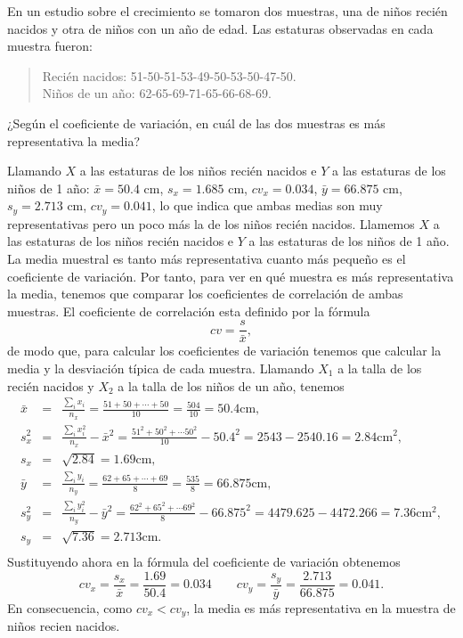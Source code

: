 {En un estudio sobre el crecimiento se tomaron dos muestras, una de niños recién nacidos y otra de niños con un año de edad. Las estaturas observadas en cada muestra fueron:
\begin{quote}
Recién nacidos: 51-50-51-53-49-50-53-50-47-50.\\
Niños de un año: 62-65-69-71-65-66-68-69.
\end{quote}

¿Según el coeficiente de variación, en cuál de las dos muestras es más representativa la media?
}
{Llamando $X$ a las estaturas de los niños recién nacidos e $Y$ a las estaturas de los niños de 1 año: 
$\bar x = 50.4$ cm, $s_x = 1.685$ cm, $cv_x=0.034$, $\bar y=66.875$ cm, $s_y=2.713$ cm, $cv_y=0.041$, lo que indica que ambas medias son muy representativas pero un poco más la de los niños recién nacidos.  
}
{Llamemos $X$ a las estaturas de los niños recién nacidos e $Y$ a las estaturas de los niños de 1 año. 
La media muestral es tanto más representativa cuanto más pequeño es el coeficiente de variación.
Por tanto, para ver en qué muestra es más representativa la media, tenemos que comparar los coeficientes de correlación de ambas muestras.
El coeficiente de correlación esta definido por la fórmula
\[
cv=\frac{s}{\bar{x}},
\]
de modo que, para calcular los coeficientes de variación tenemos que calcular la media y la desviación típica de cada muestra. 
Llamando $X_{1}$ a la talla de los recién nacidos y $X_{2}$ a la talla de los niños de un año, tenemos
\begin{eqnarray*}
\bar{x} & = & \frac{\sum_{i}^{}x_{i}}{n_{x}} =
\frac{51+50+\cdots +50}{10} = \frac{504}{10} =50.4 \mbox{cm}, \\
s_{x}^2 & = & \frac{\sum_{i}^{}x_{i}^2}{n_{x}}-\bar{x}^2 =
\frac{51^2+50^2+\cdots 50^2}{10}-50.4^2 = 2543-2540.16 = 2.84 \mbox{cm}^2,  \\
s_{x} & = & \sqrt{2.84} = 1.69 \mbox{cm},  \\
\bar{y} & = & \frac{\sum_{i}^{}y_{i}}{n_{y}} =
\frac{62+65+\cdots +69}{8} = \frac{535}{8} = 66.875 \mbox{cm},  \\
s_{y}^2 & = & \frac{\sum_{i}^{}y_{i}^2}{n_{y}}-\bar{y}^2 =
\frac{62^2+65^2+\cdots 69^2}{8}-66.875^2 = 4479.625-4472.266 = 7.36 \mbox{cm}^2,  \\
s_{y} & = & \sqrt{7.36} = 2.713 \mbox{cm}.  \\
\end{eqnarray*}
Sustituyendo ahora en la fórmula del coeficiente de variación obtenemos
\[ 
cv_{x}=\frac{s_{x}}{\bar{x}} = \frac{1.69}{50.4} = 0.034 \qquad
cv_{y}=\frac{s_{y}}{\bar{y}} = \frac{2.713}{66.875} = 0.041.
\]
En consecuencia, como $cv_{x}<cv_{y}$, la media es más representativa en la muestra de niños recien nacidos.
}


